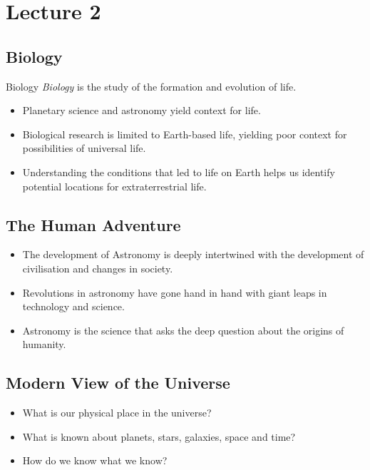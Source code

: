 \documentclass[class=article, crop=false]{standalone}
\begin{document}
  \section{Lecture 2}
  \subsection{Biology}
  \begin{definition}{Biology}
    \emph{Biology} is the study of the formation and evolution of life.
  \end{definition}
  \begin{itemize}
    \item Planetary science and astronomy yield context for life.
    \item Biological research is limited to Earth-based life, yielding poor context for possibilities of universal life.
    \item Understanding the conditions that led to life on Earth helps us identify potential locations for extraterrestrial life.
  \end{itemize}
  \subsection{The Human Adventure}
  \begin{itemize}
    \item The development of Astronomy is deeply intertwined with the development of civilisation and changes in society.
    \item Revolutions in astronomy have gone hand in hand with giant leaps in technology and science.
    \item Astronomy is the science that asks the deep question about the origins of humanity.
  \end{itemize}
  \subsection{Modern View of the Universe}
  \begin{itemize}
    \item What is our physical place in the universe?
    \item What is known about planets, stars, galaxies, space and time?
    \item How do we know what we know?
  \end{itemize}
\end{document}

